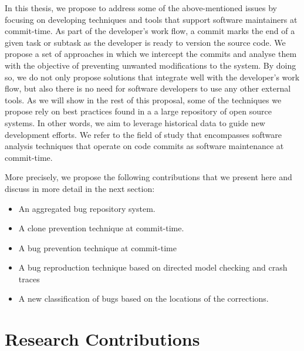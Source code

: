In this thesis, we propose to address some of the above-mentioned issues by focusing on developing techniques and tools that support software maintainers at commit-time. As part of the developer's work flow, a commit marks the end of a given task or subtask  as the developer is ready to version the source code. We propose a set of approaches in which we intercept the commits and analyse them with the objective of preventing unwanted modifications to the system. By doing so, we do not only propose solutions that integrate well with the developer's work flow, but also there is no need for software developers to use any other external tools. As we will show in the rest of this proposal, some of the techniques we propose rely on best practices found in a a large repository of open source systems. In other words, we aim to leverage historical data to guide new development efforts. We refer to the field of study that encompasses software analysis techniques that operate on code commits as software maintenance at commit-time.

More precisely, we propose the following contributions that we present here and discuss in more detail in the next section:
\begin{itemize}
	\item An aggregated bug repository system.
	\item A clone prevention technique at commit-time.
	\item A bug prevention technique at commit-time
	\item A bug reproduction technique based on directed model checking and crash traces
	\item A new classification of bugs based on the locations of the corrections.
\end{itemize}


\section{Research Contributions\label{sec:objective-thesis}}

